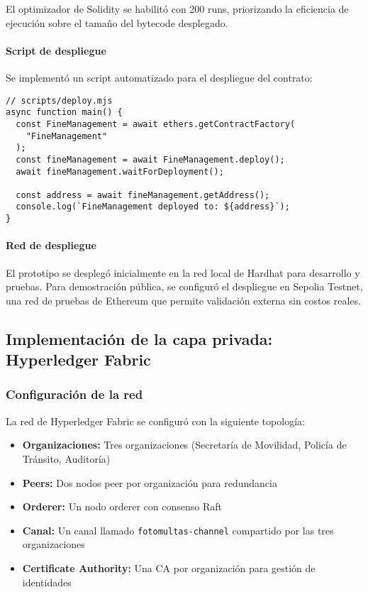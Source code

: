 El optimizador de Solidity se habilitó con 200 runs, priorizando la eficiencia de ejecución sobre el tamaño del bytecode desplegado.

\paragraph{Script de despliegue}
Se implementó un script automatizado para el despliegue del contrato:

\begin{verbatim}
// scripts/deploy.mjs
async function main() {
  const FineManagement = await ethers.getContractFactory(
    "FineManagement"
  );
  const fineManagement = await FineManagement.deploy();
  await fineManagement.waitForDeployment();
  
  const address = await fineManagement.getAddress();
  console.log(`FineManagement deployed to: ${address}`);
}
\end{verbatim}

\paragraph{Red de despliegue}
El prototipo se desplegó inicialmente en la red local de Hardhat para desarrollo y pruebas. Para demostración pública, se configuró el despliegue en Sepolia Testnet, una red de pruebas de Ethereum que permite validación externa sin costos reales.

\subsection{Implementación de la capa privada: Hyperledger Fabric}

\subsubsection{Configuración de la red}

La red de Hyperledger Fabric se configuró con la siguiente topología:

\begin{itemize}
    \item \textbf{Organizaciones:} Tres organizaciones (Secretaría de Movilidad, Policía de Tránsito, Auditoría)
    \item \textbf{Peers:} Dos nodos peer por organización para redundancia
    \item \textbf{Orderer:} Un nodo orderer con consenso Raft
    \item \textbf{Canal:} Un canal llamado \texttt{fotomultas-channel} compartido por las tres organizaciones
    \item \textbf{Certificate Authority:} Una CA por organización para gestión de identidades
\end{itemize}

